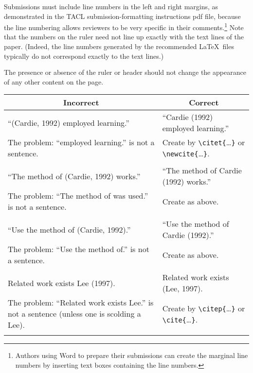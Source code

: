 \documentclass[11pt,a4paper]{article}
\newcommand{\ex}[1]{{\sf #1}}
\begin{document}
Submissions must include line numbers in the left and right
margins, as demonstrated in the TACL submission-formatting
instructions pdf file, because the line numbering allows reviewers to be very
specific in their comments.\footnote{Authors using Word to prepare their
submissions can create the marginal line numbers by inserting text
boxes containing the line numbers.}
Note that the numbers on the ruler need not line up exactly with the text lines
of the paper. (Indeed, the line numbers generated by the recommended \LaTeX{}les typically do not correspond exactly to the text lines.)
\fi

The presence or absence of the ruler or header should not change the appearance
of any other content on the page.



\begin{table*}[t]
\centering
\begin{tabular}{p{7.8cm}@{\hskip .5cm}p{7.8cm}}
\multicolumn{1}{c}{{\bf Incorrect}} & \multicolumn{1}{c}{{\bf Correct}} \\  \hline
``\ex{(Cardie, 1992) employed learning.}'' &
``\ex{Cardie (1992) employed learning.}'' \\
{The problem}:  ``employed learning.'' is not a sentence.  & Create by
\verb+\citet{+\ldots\verb+}+  or \verb+\newcite{+\ldots\verb+}+. \\
\\  \hline
``\ex{The method of (Cardie, 1992) works.}'' &
``\ex{The method of Cardie (1992) works.}''  \\
{The problem}:  ``The method of was used.'' is not a sentence.  & Create as
above.\\ \\\hline
``\ex{Use the method of (Cardie, 1992).}'' &
``\ex{Use the method of Cardie (1992).}''  \\
{The problem}:  ``Use the method of.'' is not a sentence.  & Create as
above.\\ \\\hline
\ex{Related work exists Lee (1997).} & \ex{Related work exists (Lee,
1997).} \\
{The problem}:  ``Related work exists Lee.'' is not a sentence (unless one
is scolding a Lee). & Create by
\verb+\citep{+\ldots\verb+}+  or \verb+\cite{+\ldots\verb+}+. \\
\\  \hline
\end{tabular}
\caption{\label{tab:cite-commands} Examples of incorrect and correct citation
  format.  Also depicted are citation commands supported by the
  tacl2018.sty file, which is based on the natbib package and
  supports all natbib citation commands.
  The tacl2018.sty file also supports commands defined in previous ACL style
  files
  for compatibility.
  }
\end{table*}
\end{document}
